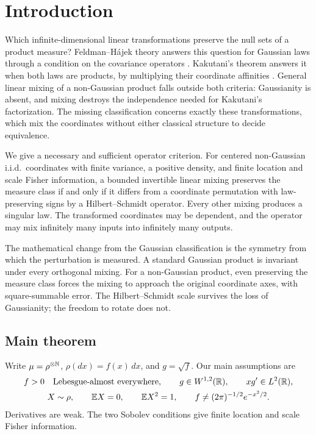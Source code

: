 \section{Introduction}

Which infinite-dimensional linear transformations preserve the null sets
of a product measure? Feldman--H\'ajek theory answers this question for
Gaussian laws through a condition on the covariance operators
\cite{feldman1958equivalence,hajek1958property,shepp1966radon,bogachev1998gaussian}.
Kakutani's theorem answers it when both laws are products, by multiplying
their coordinate affinities \cite{kakutani1948equivalence}. General linear
mixing of a non-Gaussian product falls outside both criteria: Gaussianity
is absent, and mixing destroys the independence needed for Kakutani's
factorization. The missing classification concerns exactly these
transformations, which mix the coordinates without either classical
structure to decide equivalence.

We give a necessary and sufficient operator criterion. For centered
non-Gaussian i.i.d.\ coordinates with finite variance, a positive density,
and finite location and scale Fisher information, a bounded invertible
linear mixing preserves the measure class if and only if it differs from
a coordinate permutation with law-preserving signs by a Hilbert--Schmidt
operator. Every other mixing produces a singular law. The transformed
coordinates may be dependent, and the operator may mix infinitely many
inputs into infinitely many outputs.

The mathematical change from the Gaussian classification is the symmetry
from which the perturbation is measured. A standard Gaussian product is
invariant under every orthogonal mixing. For a non-Gaussian product, even
preserving the measure class forces the mixing to approach the original
coordinate axes, with square-summable error. The Hilbert--Schmidt scale
survives the loss of Gaussianity; the freedom to rotate does not.

\subsection{Main theorem}

Write \(\mu=\rho^{\otimes\mathbb N}\), \(\rho(dx)=f(x)\,dx\), and \(g=\sqrt f\).
Our main assumptions are
\begin{equation}
 \begin{gathered}
 f>0\quad\text{Lebesgue-almost everywhere},\qquad
 g\in W^{1,2}(\mathbb R),\qquad xg'\in L^2(\mathbb R),\\
 X\sim\rho,\qquad \mathbb E X=0,\qquad \mathbb E X^2=1,\qquad
 f\ne(2\pi)^{-1/2}e^{-x^2/2}.
 \end{gathered}
 \label{eq:main-assumptions}
\end{equation}
Derivatives are weak. The two Sobolev conditions give finite location and
scale Fisher information.

